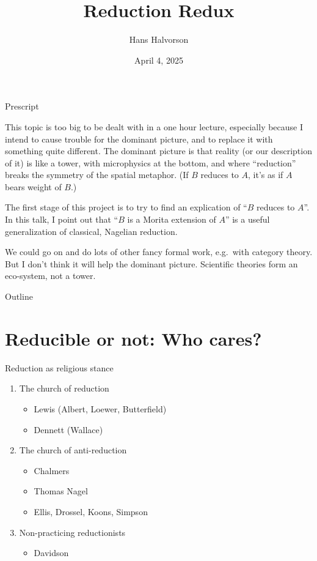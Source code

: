 \documentclass[fleqn]{beamer}
\title{Reduction Redux}
\subtitle{}
\author{Hans Halvorson}
\institute{Princeton University}
\date{April 4, 2025}
\begin{document}
\begin{frame}
  \titlepage
\end{frame}

\begin{frame}{Prescript}

  \small 

  This topic is too big to be dealt with in a one hour lecture,
  especially because I intend to cause trouble for the dominant
  picture, and to replace it with something quite different. The
  dominant picture is that reality (or our description of it) is like
  a tower, with microphysics at the bottom, and where ``reduction''
  breaks the symmetry of the spatial metaphor. (If $B$ reduces to $A$,
  it's as if $A$ bears weight of $B$.)

  The first stage of this project is to try to find an explication of
  ``$B$ reduces to $A$''. In this talk, I point out that ``$B$ is a
  Morita extension of $A$'' is a useful generalization of classical,
  Nagelian reduction.

  We could go on and do lots of other fancy formal work, e.g.\ with
  category theory. But I don't think it will help the dominant
  picture. Scientific theories form an eco-system, not a tower.
  
\end{frame}

\begin{frame}{Outline}
  \tableofcontents
\end{frame}




\section{Reducible or not: Who cares?}

\begin{frame}{Reduction as religious stance}

  \begin{enumerate}
  \item The church of reduction
    \begin{itemize}
    \item Lewis (Albert, Loewer, Butterfield)
    \item Dennett (Wallace)
    \end{itemize}
  \item The church of anti-reduction
    \begin{itemize}
    \item Chalmers
    \item Thomas Nagel  
    \item Ellis, Drossel, Koons, Simpson
    \end{itemize}
  \item Non-practicing reductionists
    \begin{itemize}
    \item Davidson 
    \end{itemize}
  \end{enumerate}

\end{frame}
\end{document}
